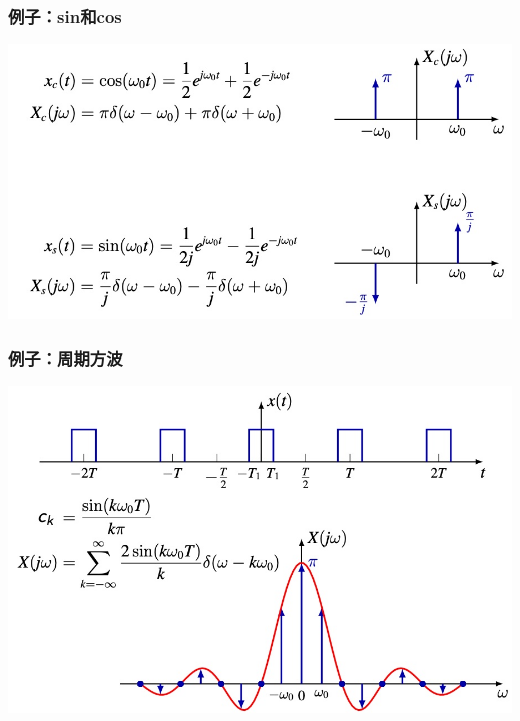 \documentclass[CJKutf8,dvipsnames,table]{beamer}
\begin{document}
\begin{CJK*}{UTF8}{song}
  \begin{frame}
    \frametitle{例子：sin和cos}
    \begin{center}
      \includegraphics[scale=.4]{ftsincos}
    \end{center}    
  \end{frame}

  \begin{frame}
    \frametitle{例子：周期方波}
    \begin{center}
      \includegraphics[scale=.35]{ftpsquare}
    \end{center}    
  \end{frame}    
    

\end{CJK*}
\end{document}
